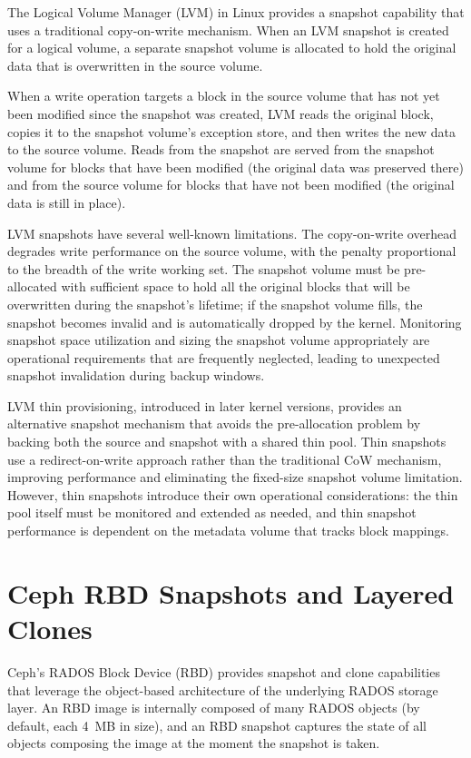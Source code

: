 The Logical Volume Manager (LVM) in Linux provides a snapshot capability that uses a traditional copy-on-write mechanism. When an LVM snapshot is created for a logical volume, a separate snapshot volume is allocated to hold the original data that is overwritten in the source volume.

When a write operation targets a block in the source volume that has not yet been modified since the snapshot was created, LVM reads the original block, copies it to the snapshot volume's exception store, and then writes the new data to the source volume. Reads from the snapshot are served from the snapshot volume for blocks that have been modified (the original data was preserved there) and from the source volume for blocks that have not been modified (the original data is still in place).

LVM snapshots have several well-known limitations. The copy-on-write overhead degrades write performance on the source volume, with the penalty proportional to the breadth of the write working set. The snapshot volume must be pre-allocated with sufficient space to hold all the original blocks that will be overwritten during the snapshot's lifetime; if the snapshot volume fills, the snapshot becomes invalid and is automatically dropped by the kernel. Monitoring snapshot space utilization and sizing the snapshot volume appropriately are operational requirements that are frequently neglected, leading to unexpected snapshot invalidation during backup windows.

LVM thin provisioning, introduced in later kernel versions, provides an alternative snapshot mechanism that avoids the pre-allocation problem by backing both the source and snapshot with a shared thin pool. Thin snapshots use a redirect-on-write approach rather than the traditional CoW mechanism, improving performance and eliminating the fixed-size snapshot volume limitation. However, thin snapshots introduce their own operational considerations: the thin pool itself must be monitored and extended as needed, and thin snapshot performance is dependent on the metadata volume that tracks block mappings.

\section{Ceph RBD Snapshots and Layered Clones}

Ceph's RADOS Block Device (RBD) provides snapshot and clone capabilities that leverage the object-based architecture of the underlying RADOS storage layer. An RBD image is internally composed of many RADOS objects (by default, each 4~MB in size), and an RBD snapshot captures the state of all objects composing the image at the moment the snapshot is taken.


